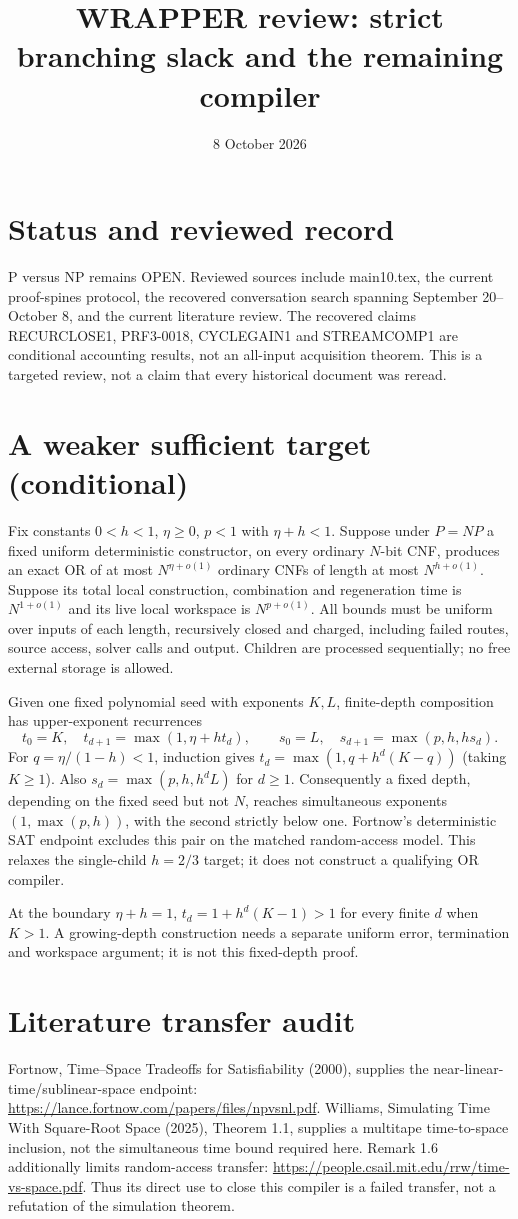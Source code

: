 \documentclass{article}
\title{WRAPPER review: strict branching slack and the remaining compiler}
\date{8 October 2026}
\begin{document}
\maketitle
\section{Status and reviewed record}
P versus NP remains OPEN. Reviewed sources include main10.tex, the current
proof-spines protocol, the recovered conversation search spanning September
20--October 8, and the current literature review. The recovered claims
RECURCLOSE1, PRF3-0018, CYCLEGAIN1 and STREAMCOMP1 are conditional accounting
results, not an all-input acquisition theorem. This is a targeted review,
not a claim that every historical document was reread.
\section{A weaker sufficient target (conditional)}
Fix constants $0<h<1$, $\eta\ge0$, $p<1$ with $\eta+h<1$.
Suppose under $P=NP$ a fixed uniform deterministic constructor, on every
ordinary $N$-bit CNF, produces an exact OR of at most $N^{\eta+o(1)}$
ordinary CNFs of length at most $N^{h+o(1)}$. Suppose its total local
construction, combination and regeneration time is $N^{1+o(1)}$ and
its live local workspace is $N^{p+o(1)}$. All bounds must be uniform over
inputs of each length, recursively closed and charged, including failed
routes, source access, solver calls and output. Children are processed
sequentially; no free external storage is allowed.

Given one fixed polynomial seed with exponents $K,L$, finite-depth
composition has upper-exponent recurrences
\[
t_0=K,\quad t_{d+1}=\max(1,\eta+ht_d),\qquad
s_0=L,\quad s_{d+1}=\max(p,h,hs_d).
\]
For $q=\eta/(1-h)<1$, induction gives
$t_d=\max(1,q+h^d(K-q))$ (taking $K\ge1$).
Also $s_d=\max(p,h,h^dL)$ for $d\ge1$.
Consequently a fixed depth, depending on the fixed seed but not $N$,
reaches simultaneous exponents $(1,\max(p,h))$, with the second strictly
below one. Fortnow's deterministic SAT endpoint excludes this pair on
the matched random-access model. This relaxes the single-child $h=2/3$
target; it does not construct a qualifying OR compiler.

At the boundary $\eta+h=1$, $t_d=1+h^d(K-1)>1$ for every finite
$d$ when $K>1$. A growing-depth construction needs a separate uniform
error, termination and workspace argument; it is not this fixed-depth proof.
\section{Literature transfer audit}
Fortnow, Time--Space Tradeoffs for Satisfiability (2000), supplies the
near-linear-time/sublinear-space endpoint:
\url{https://lance.fortnow.com/papers/files/npvsnl.pdf}.
Williams, Simulating Time With Square-Root Space (2025), Theorem 1.1,
supplies a multitape time-to-space inclusion, not the simultaneous time
bound required here. Remark 1.6 additionally limits random-access transfer:
\url{https://people.csail.mit.edu/rrw/time-vs-space.pdf}.
Thus its direct use to close this compiler is a failed transfer, not a
refutation of the simulation theorem.
\end{document}
